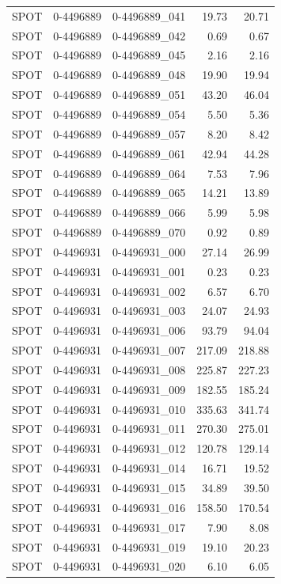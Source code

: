 \begin{tabular}{lllrr}
SPOT & 0-4496889 & 0-4496889_041 & 19.73 & 20.71 \\
SPOT & 0-4496889 & 0-4496889_042 & 0.69 & 0.67 \\
SPOT & 0-4496889 & 0-4496889_045 & 2.16 & 2.16 \\
SPOT & 0-4496889 & 0-4496889_048 & 19.90 & 19.94 \\
SPOT & 0-4496889 & 0-4496889_051 & 43.20 & 46.04 \\
SPOT & 0-4496889 & 0-4496889_054 & 5.50 & 5.36 \\
SPOT & 0-4496889 & 0-4496889_057 & 8.20 & 8.42 \\
SPOT & 0-4496889 & 0-4496889_061 & 42.94 & 44.28 \\
SPOT & 0-4496889 & 0-4496889_064 & 7.53 & 7.96 \\
SPOT & 0-4496889 & 0-4496889_065 & 14.21 & 13.89 \\
SPOT & 0-4496889 & 0-4496889_066 & 5.99 & 5.98 \\
SPOT & 0-4496889 & 0-4496889_070 & 0.92 & 0.89 \\
SPOT & 0-4496931 & 0-4496931_000 & 27.14 & 26.99 \\
SPOT & 0-4496931 & 0-4496931_001 & 0.23 & 0.23 \\
SPOT & 0-4496931 & 0-4496931_002 & 6.57 & 6.70 \\
SPOT & 0-4496931 & 0-4496931_003 & 24.07 & 24.93 \\
SPOT & 0-4496931 & 0-4496931_006 & 93.79 & 94.04 \\
SPOT & 0-4496931 & 0-4496931_007 & 217.09 & 218.88 \\
SPOT & 0-4496931 & 0-4496931_008 & 225.87 & 227.23 \\
SPOT & 0-4496931 & 0-4496931_009 & 182.55 & 185.24 \\
SPOT & 0-4496931 & 0-4496931_010 & 335.63 & 341.74 \\
SPOT & 0-4496931 & 0-4496931_011 & 270.30 & 275.01 \\
SPOT & 0-4496931 & 0-4496931_012 & 120.78 & 129.14 \\
SPOT & 0-4496931 & 0-4496931_014 & 16.71 & 19.52 \\
SPOT & 0-4496931 & 0-4496931_015 & 34.89 & 39.50 \\
SPOT & 0-4496931 & 0-4496931_016 & 158.50 & 170.54 \\
SPOT & 0-4496931 & 0-4496931_017 & 7.90 & 8.08 \\
SPOT & 0-4496931 & 0-4496931_019 & 19.10 & 20.23 \\
SPOT & 0-4496931 & 0-4496931_020 & 6.10 & 6.05 \\

\end{tabular}
